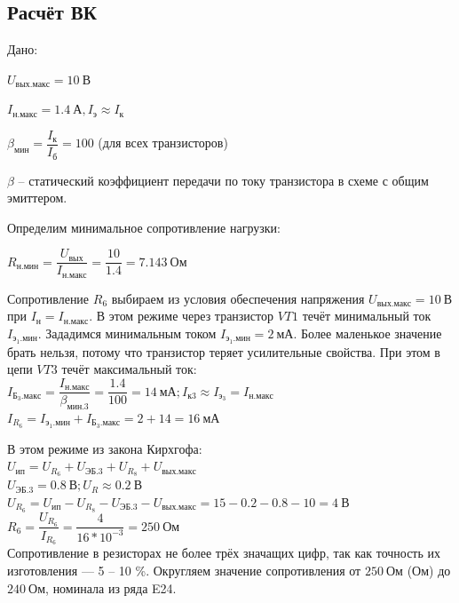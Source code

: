 \subsection{Расчёт ВК}

Дано:

$ U_{вых. макс} = 10~В $

$ I_{н. макс} = 1.4~А, I_э \approx I_к $

$ \beta_{мин} = \dfrac{I_к}{I_б} = 100 $ (для всех транзисторов)

$ \beta $ – статический коэффициент передачи
по току транзистора в схеме с общим эмиттером.

Определим минимальное сопротивление нагрузки:

$ R_{н. мин} = \dfrac{U_{вых}}{I_{н. макс}} = \dfrac{10}{1.4} = 7.143~Ом $

Сопротивление $ R_6 $ выбираем из условия
обеспечения напряжения $ U_{вых. макс} = 10~В $
при $ I_н = I_{н. макс} $. 
В этом режиме через транзистор $ VT1 $ течёт 
минимальный ток $ I_{э_1. мин} $. 
Зададимся минимальным током $ I_{э_1. мин} = 2~мА $.
Более маленькое значение брать нельзя, потому
что транзистор теряет усилительные свойства.
При этом в цепи $ VT3 $ течёт максимальный ток:\\

$
I_{Б_3. макс} = \dfrac{I_{н. макс}}{\beta_{мин.3}} =
\dfrac{1.4}{100} = 14~мА;
I_{к3} \approx I_{э_3} = I_{н. макс}
$\\

$ I_{R_6} = I_{э_1. мин} + I_{Б_3. макс} = 2 + 14 = 16~мА $\\

\newcommand{\RomanNumeralCaps}[1]
{
	\MakeUppercase{\romannumeral #1}
}

В этом режиме из \RomanNumeralCaps{2} закона Кирхгофа:\\

$ U_{ип} = U_{R_6} + U_{ЭБ. 3} + U_{R_8} + U_{вых. макс} $\\

$ U_{ЭБ. 3} = 0.8~В; U_R \approx 0.2~В $\\

$
U_{R_6} = 
U_{ип} - U_{R_8} - U_{ЭБ. 3} - U_{вых. макс} = 
15 - 0.2 - 0.8 - 10 = 4~В
$\\

$ 
R_6 = 
\dfrac{U_{R_6}}{I_{R_6}} = 
\dfrac{4}{16 * 10^{-3}} = 
250~Ом 
$\\

Сопротивление в резисторах не более трёх значащих цифр, 
так как точность их изготовления --- 5 -- 10 \%.
Округляем значение сопротивления 
от $ 250~Ом $ (Ом) до $ 240~Ом $,
номинала из ряда E24.

